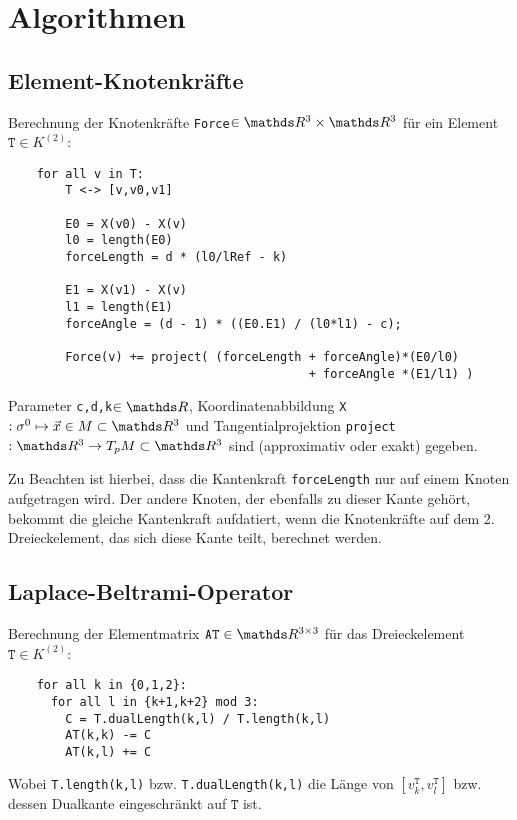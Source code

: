 \section{Algorithmen}
  
  
  \subsection{Element-Knotenkräfte}
    \label{AlgoForces}
    Berechnung der Knotenkräfte \texttt{Force}\( \in\R^{3}\times\R^{3} \) für ein Element 
    \(\mathtt{T} \in K^{(2)}\):

    \begin{verbatim}
    for all v in T:
        T <-> [v,v0,v1]
        
        E0 = X(v0) - X(v)
        l0 = length(E0)
        forceLength = d * (l0/lRef - k)

        E1 = X(v1) - X(v)
        l1 = length(E1)
        forceAngle = (d - 1) * ((E0.E1) / (l0*l1) - c);

        Force(v) += project( (forceLength + forceAngle)*(E0/l0) 
                                          + forceAngle *(E1/l1) ) 
    \end{verbatim}

    Parameter \texttt{c,d,k}\( \in\R \), 
    Koordinatenabbildung \texttt{X}\(: \sigma^{0} \mapsto \vec{x}\in M \subset \R^{3} \) 
    und Tangentialprojektion \texttt{project}\(: \R^{3} \rightarrow T_{p}M \subset \R^{3} \)
    sind (approximativ oder exakt) gegeben.

    Zu Beachten ist hierbei, dass die Kantenkraft \texttt{forceLength} nur auf einem Knoten aufgetragen wird.
    Der andere Knoten, der ebenfalls zu dieser Kante gehört, bekommt die gleiche Kantenkraft aufdatiert, wenn die Knotenkräfte auf dem 2. Dreieckelement, das sich diese Kante teilt, berechnet
    werden.

    
  \subsection{Laplace-Beltrami-Operator}
    \label{subsecAlgoLBeltrami}
    Berechnung der Elementmatrix \( \mathtt{AT}\in\R^{3\times 3} \) für das Dreieckelement
    \( \mathtt{T}\in K^{(2)} \):
    \begin{verbatim}
    for all k in {0,1,2}:
      for all l in {k+1,k+2} mod 3:
        C = T.dualLength(k,l) / T.length(k,l)
        AT(k,k) -= C
        AT(k,l) += C
    \end{verbatim}
    Wobei \texttt{T.length(k,l)} bzw. \texttt{T.dualLength(k,l)} die Länge von
    \( \left[ v^{\mathtt{T}}_{k} , v^{\mathtt{T}}_{l} \right] \) bzw. dessen Dualkante eingeschränkt auf \(
   \mathtt{T} \) ist.

